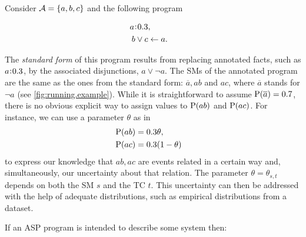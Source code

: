 \documentclass{llncs}
\newcommand{\at}[1]{\ensuremath{\!\del{#1}}}
\newcommand{\co}[1]{\ensuremath{\overline{#1}}}
\newcommand{\fml}[1]{\ensuremath{{\cal #1}}}
\newcommand{\pr}[1]{\ensuremath{\mathrm{P}\at{#1}}}
\newcommand{\probfact}[2]{\ensuremath{#2\mkern-4mu:\mkern-4mu#1}}
\renewcommand{\note}[1]{
    \stepcounter{remark}%
    {\!\!\color{red}/}\footnotemark[\arabic{remark}]\!\!%
    \footnotetext[\arabic{remark}]{{\color{red}/}#1}
}
\begin{document}
\begin{example}\label{running.example}
    Consider $\fml{A} = \set{a, b, c}$ and the following program

    \begin{equation}
        \begin{aligned}
            \probfact{0.3}{a} & ,\cr
            b \vee c          & \leftarrow a.
        \end{aligned}
        \label{eq:example.1}
    \end{equation}

    The \emph{standard form} of this program results from replacing annotated facts, such as $\probfact{0.3}{a}$, by the associated disjunctions, $a \vee \neg a$. The \aclp{SM} of the annotated program are the same as the ones from the standard form:  $\co{a}, ab$ and $ac$, where $\co{a}$ stands for $\neg a$ (see \cref{fig:running.example}). While it is straightforward to assume $\pr{\co{a}}=0.7$, there is no obvious explicit way to assign values to $\pr{ab}$ and $\pr{ac}$. For instance, we can use a parameter $\theta$ as in
    $$
        \begin{aligned}
            \pr{ab} & = 0.3 \theta,\cr
            \pr{ac} & = 0.3 (1 - \theta)
        \end{aligned}
    $$
    to express our knowledge that $ab,ac$ are events related in a certain way and, simultaneously, our uncertainty about that relation. The pa\-ra\-me\-ter $\theta=\theta_{s,t}$ depends on both the \acl{SM} $s$ and the \acl{TC} $t$. This uncertainty can then be addressed with the help of adequate distributions, such as empirical distributions from a dataset.
\end{example}

If an \ac{ASP} program is intended to describe some system then:
\end{document}
